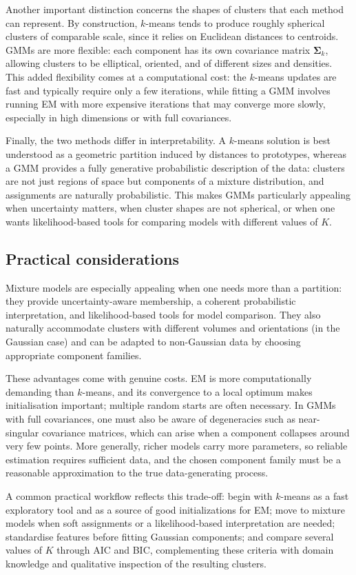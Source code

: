 Another important distinction concerns the shapes of clusters that each method can
represent. By construction, $k$-means tends to produce roughly spherical clusters of
comparable scale, since it relies on Euclidean distances to centroids. GMMs are more
flexible: each component has its own covariance matrix $\boldsymbol{\Sigma}_k$, allowing
clusters to be elliptical, oriented, and of different sizes and densities. This added flexibility
comes at a computational cost: the $k$-means updates are fast and typically require only a
few iterations, while fitting a GMM involves running EM with more expensive iterations that
may converge more slowly, especially in high dimensions or with full covariances.

Finally, the two methods differ in interpretability. A $k$-means solution is best understood
as a geometric partition induced by distances to prototypes, whereas a GMM provides a
fully generative probabilistic description of the data: clusters are not just regions of space
but components of a mixture distribution, and assignments are naturally probabilistic. This
makes GMMs particularly appealing when uncertainty matters, when cluster shapes are
not spherical, or when one wants likelihood-based tools for comparing models with different
values of $K$.

\subsection*{Practical considerations}

Mixture models are especially appealing when one needs more than a partition: they
provide uncertainty-aware membership, a coherent probabilistic interpretation, and
likelihood-based tools for model comparison. They also naturally accommodate clusters
with different volumes and orientations (in the Gaussian case) and can be adapted to
non-Gaussian data by choosing appropriate component families.

These advantages come with genuine costs. EM is more computationally demanding than
$k$-means, and its convergence to a local optimum makes initialisation important; multiple
random starts are often necessary. In GMMs with full covariances, one must also be aware
of degeneracies such as near-singular covariance matrices, which can arise when a
component collapses around very few points. More generally, richer models carry more
parameters, so reliable estimation requires sufficient data, and the chosen component
family must be a reasonable approximation to the true data-generating process.

A common practical workflow reflects this trade-off: begin with $k$-means as a fast
exploratory tool and as a source of good initializations for EM; move to mixture models
when soft assignments or a likelihood-based interpretation are needed; standardise features
before fitting Gaussian components; and compare several values of $K$ through AIC and
BIC, complementing these criteria with domain knowledge and qualitative inspection of the
resulting clusters.
%